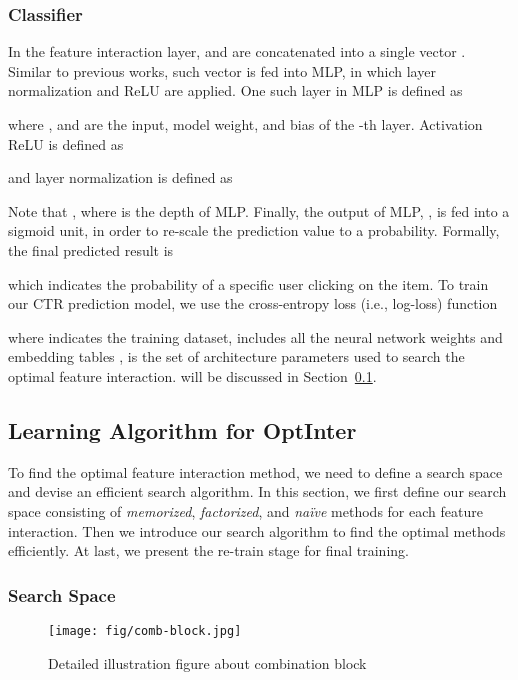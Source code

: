 \documentclass[conference]{IEEEtran}
\begin{document}
\subsubsection{Classifier}
\label{classifier}
In the feature interaction layer,  and  are concatenated into a single vector . Similar to previous works\cite{PNN16,DeepFM,PNN19}, such vector  is fed into MLP, in which layer normalization and ReLU are applied. One such layer in MLP is defined as

where ,  and  are the input, model weight, and bias of the -th layer. Activation ReLU is defined as

and layer normalization is defined as \cite{LayerNorm} 


Note that , where  is the depth of MLP. Finally, the output of MLP, , is fed into a sigmoid unit, in order to re-scale the prediction value to a probability. Formally, the final predicted result is 

which indicates the probability of a specific user clicking on the item. To train our CTR prediction model, we use the cross-entropy loss (i.e., log-loss) function


where  indicates the training dataset,  includes all the neural network weights  and embedding tables ,  is the set of architecture parameters used to search the optimal feature interaction.  will be discussed in Section~\ref{sec:learning}. 

\subsection{Learning Algorithm for OptInter}
\label{sec:learning}

To find the optimal feature interaction method, we need to define a search space and devise an efficient search algorithm. In this section, we first define our search space consisting of \emph{memorized}, \emph{factorized}, and \emph{naïve} methods for each feature interaction. Then we introduce our search algorithm to find the optimal methods efficiently. At last, we present the re-train stage for final training.

\subsubsection{Search Space}

\begin{figure}[!htbp]
\centering
\texttt{[image: fig/comb-block.jpg]}
\caption{Detailed illustration figure about combination block}
\label{fig:gate} 
\end{figure}
\end{document}
